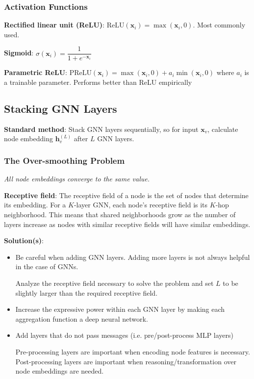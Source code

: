 \documentclass[12pt]{article}
\newcommand{\tbf}{\textbf}
\newcommand{\tit}{\textit}
\newcommand{\mbf}{\mathbf}
\begin{document}
\subsubsection*{Activation Functions}

\tbf{Rectified linear unit (ReLU)}: $\text{ReLU}(\mbf{x}_i) =
\max(\mbf{x}_i,0)$. Most commonly used.

\smallskip
\tbf{Sigmoid}: $\sigma(\mbf{x}_i) = \dfrac{1}{1+e^{-\mbf{x}_i}}$

\smallskip
\tbf{Parametric ReLU}: $\text{PReLU}(\mbf{x}_i) = \max(\mbf{x}_i,0) +
a_i\min(\mbf{x}_i,0)$ where $a_i$ is a trainable parameter. Performs better than
ReLU empirically

\subsection*{Stacking GNN Layers}

\tbf{Standard method}: Stack GNN layers sequentially, so for input $\mbf{x}_v$,
calculate node embedding $\mbf{h}_v^{(L)}$ after $L$ GNN layers.

\subsubsection*{The Over-smoothing Problem}

\tit{All node embeddings converge to the same value.}

\medskip
\tbf{Receptive field}: The receptive field of a node is the set of nodes that
determine its embedding. For a $K$-layer GNN, each node's receptive field is its
$K$-hop neighborhood. This means that shared neighborhoods grow as the number of
layers increase as nodes with similar receptive fields will have similar
embeddings.

\medskip
\tbf{Solution(s)}:
\begin{itemize}
  \itemsep0em
  \item Be careful when adding GNN layers. Adding more layers is not always
    helpful in the case of GNNs.

    Analyze the receptive field necessary to solve the problem and set $L$ to be
    slightly larger than the required receptive field.
  \item Increase the expressive power within each GNN layer by making each
    aggregation function a deep neural network.
  \item Add layers that do not pass messages (i.e. pre/post-process MLP layers)

    Pre-processing layers are important when encoding node features is
    necessary. Post-processing layers are important when
    reasoning/transformation over node embeddings are needed.
\end{itemize}
\end{document}
